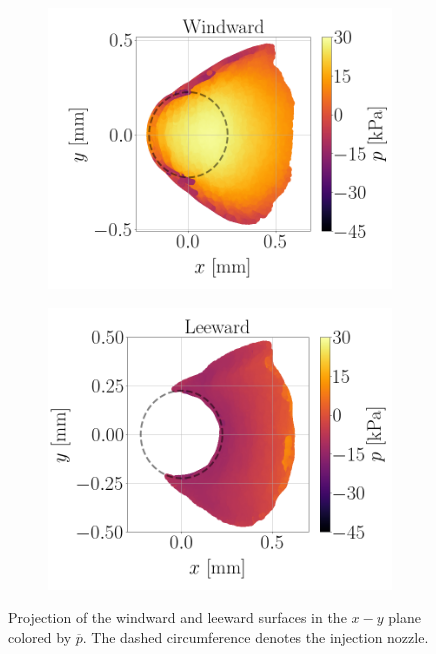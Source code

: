 \begin{figure}[ht]
\flushleft
\begin{subfigure}[b]{0.45\textwidth}
	\flushleft
   \includegraphics[scale=0.3]{./part2_developments/figures_ch5_resolved_JICF/pressure_obtention_mean_DC/p_mean_scatter_UG100_DX10_windward}
\end{subfigure}
\hspace{0.5in}
\begin{subfigure}[b]{0.45\textwidth}
	\flushleft
   \includegraphics[scale=0.3]{./part2_developments/figures_ch5_resolved_JICF/pressure_obtention_mean_DC/p_mean_scatter_UG100_DX10_leeward}
\end{subfigure}
\caption[Projection of the windward and leeward surfaces in the $x-y$ plane colored by $\overline{p}$.]{Projection of the windward and leeward surfaces in the $x-y$ plane colored by $\overline{p}$. The dashed circumference denotes the injection nozzle.}
\label{fig:jicf_DC_p_mean_scatterplots}
\end{figure}


